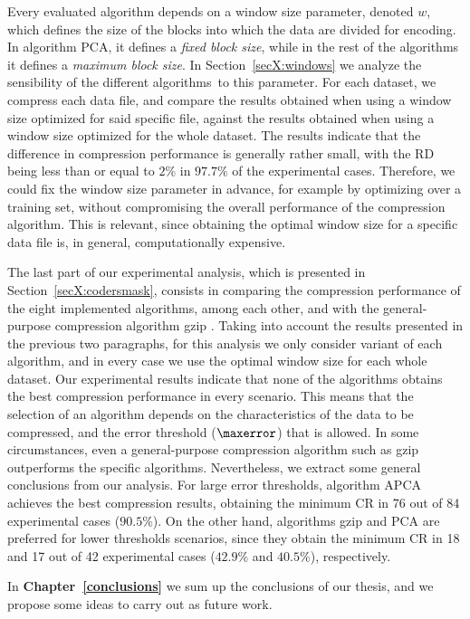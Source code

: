 Every evaluated algorithm depends on a window size parameter, denoted $w$, which defines the size of the blocks into which the data are divided for encoding. In algorithm PCA, it defines a \textit{fixed block size}, while in the rest of the algorithms it defines a \textit{maximum block size}. In Section~\ref{secX:windows} we analyze the sensibility of the different algorithms\footSupportFocus\ to this parameter. For each dataset, we compress each data file, and compare the results obtained when using a window size optimized for said specific file, against the results obtained when using a window size optimized for the whole dataset. The results indicate that the difference in compression performance is generally rather small, with the RD being less than or equal to $2\%$ in $97.7\%$ of the experimental cases. Therefore, we could fix the window size parameter in advance, for example by optimizing over a training set, without compromising the overall performance of the compression algorithm. This is relevant, since obtaining the optimal window size for a specific data file is, in general, computationally expensive.


The last part of our experimental analysis, which is presented in Section~\ref{secX:codersmask}, consists in comparing the compression performance of the eight implemented algorithms, among each other, and with the general-purpose compression algorithm gzip \cite{gzip}. Taking into account the results presented in the previous two paragraphs, for this analysis we only consider variant \maskalgo of each algorithm, and in every case we use the optimal window size for each whole dataset. Our experimental results indicate that none of the algorithms obtains the best compression performance in every scenario. This means that the selection of an algorithm depends on the characteristics of the data to be compressed, and the error threshold ($\maxerror$) that is allowed. In some circumstances, even a general-purpose compression algorithm such as gzip outperforms the specific algorithms. Nevertheless, we extract some general conclusions from our analysis. For large error thresholds, algorithm APCA achieves the best compression results, obtaining the minimum CR in 76 out of 84 experimental cases ($90.5\%$). On the other hand, algorithms gzip and PCA are preferred for lower thresholds scenarios, since they obtain the minimum CR in 18 and 17 out of 42 experimental cases ($42.9\%$ and $40.5\%$), respectively.


In \textbf{Chapter~\ref{conclusions}} we sum up the conclusions of our thesis, and we propose some ideas to carry out as future work.



